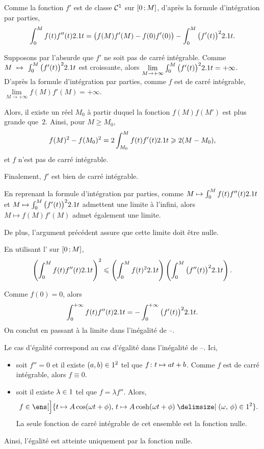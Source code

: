 \begin{solution}
\begin{reponses}
\item Comme la fonction $f'$ est de classe $\Cont^1$ sur $\interff{0}{M}$, d'après la formule d'intégration par parties,
\[
\int_0^M f(t) f''(t) \d t = \big(f(M) f'(M) - f(0) f'(0)\big) - \int_0^M \big(f'(t)\big)^2 \d t.
\]

\item Supposons par l'absurde que $f'$ ne soit pas de carré intégrable. Comme $M~\mapsto~\int_0^M \big(f'(t)\big)^2 \d t$ est croissante, alors $\lim\limits_{M\to+\infty} \int_0^M \big(f'(t)\big)^2 \d t = +\infty$. D'après la formule d'intégration par parties, comme $f$ est de carré intégrable, $\lim\limits_{M\to+\infty} f(M) f'(M) = +\infty$.

Alors, il existe un réel $M_0$ à partir duquel la fonction $f(M) f(M')$ est plus grande que~$2$. Ainsi, pour $M \geqslant M_0$,
\[
f(M)^2 - f(M_0)^2 = 2 \int_{M_0}^M f(t) f'(t) \d t \geqslant 2 (M - M_0),
\]
et $f$ n'est pas de carré intégrable.

Finalement, $f'$ est bien de carré intégrable.

\item En reprenant la formule d'intégration par parties, comme $M \mapsto \int_0^M f(t) f''(t) \d t$ et $M \mapsto \int_0^M \big(f'(t)\big)^2 \d t$ admettent une limite à l'infini, alors $M \mapsto f(M) f'(M)$ admet également une limite.

De plus, l'argument précédent assure que cette limite doit être nulle.

\item En utilisant l' sur $\interff{0}{M}$,
\[
\left(\int_0^M f(t) f''(t) \d t\right)^2 \leqslant \left(\int_0^M f(t)^2 \d t\right) \left( \int_0^M \big(f''(t)\big)^2 \d t \right).
\]

\item Comme $f(0) = 0$, alors
\[
\int_0^{+\infty} f(t) f''(t) \d t = - \int_0^{+\infty} \big(f'(t)\big)^2 \d t.
\]
On conclut en passant à la limite dans l'inégalité de --.
\end{reponses}
\end{solution}

\begin{remarque}
Le cas d'égalité correspond au cas d'égalité dans l'inégalité de --. Ici,
\begin{itemize}
\item soit $f'' = 0$ et il existe $(a, b) \in \R^2$ tel que $\fonctionligne[f]{t}{a t + b}$. Comme $f$ est de carré intégrable, alors $f \equiv 0$.

\item soit il existe $\lambda \in \R$ tel que $f = \lambda f''$. Alors,
\[
f \in \ens[\Big]{t \mapsto A \cos(\omega t + \phi),\, t \mapsto A \cosh(\omega t + \phi) \tq (\omega,\, \phi) \in \R^2}.
\]
La seule fonction de carré intégrable de cet ensemble est la fonction nulle.
\end{itemize}
Ainsi, l'égalité est atteinte uniquement par la fonction nulle.
\end{remarque}

